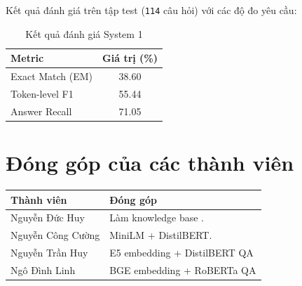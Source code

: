 \documentclass[12pt,a4paper]{report}
\begin{document}
Kết quả đánh giá trên tập test (\texttt{114} câu hỏi) với các độ đo yêu cầu:

\begin{table}[H]
\centering
\caption{Kết quả đánh giá System 1}
\begin{tabular}{|l|c|}
\hline
\textbf{Metric} & \textbf{Giá trị (\%)} \\
\hline
Exact Match (EM) & 38.60 \\
\hline
Token-level F1 & 55.44 \\
\hline
Answer Recall & 71.05 \\
\hline
\end{tabular}
\end{table}
















\newpage
\section*{Đóng góp của các thành viên}

\begin{table}[h]
\centering
\begin{tabular}{|l|p{10cm}|}
\hline
\textbf{Thành viên} & \textbf{Đóng góp} \\
\hline
Nguyễn Đức Huy & Làm knowledge base . \\
\hline
Nguyễn Công Cường & MiniLM + DistilBERT. \\
\hline
Nguyễn Trần Huy & E5 embedding + DistilBERT QA  \\
\hline
Ngô Đình Linh & BGE embedding + RoBERTa QA  \\
\hline
\end{tabular}
\end{table}
\end{document}
